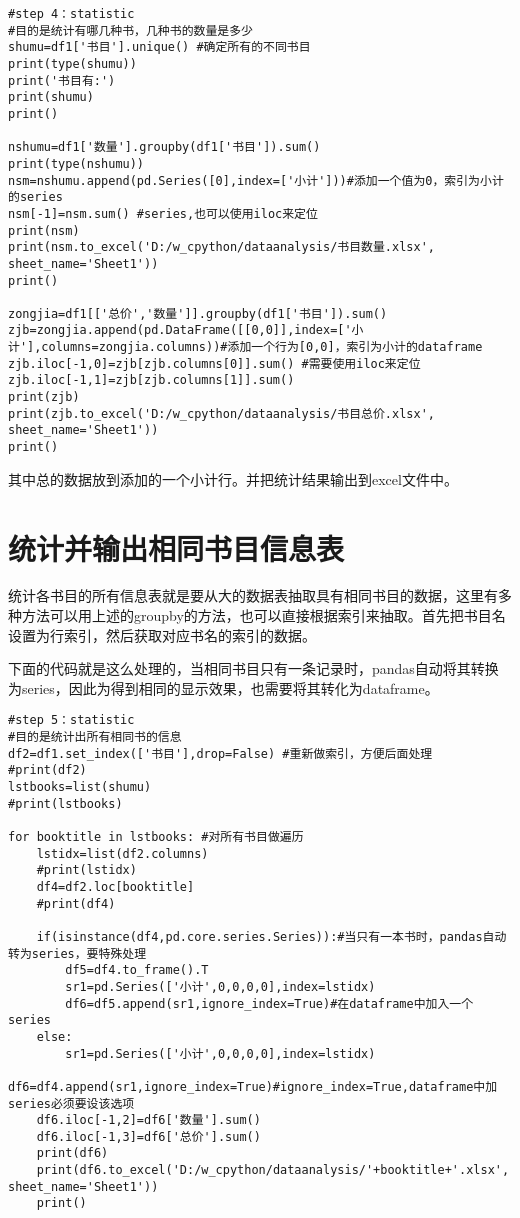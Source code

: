 \documentclass[twoside,11pt]{book}
\begin{document}
\begin{lstlisting}
#step 4：statistic
#目的是统计有哪几种书，几种书的数量是多少
shumu=df1['书目'].unique() #确定所有的不同书目
print(type(shumu))
print('书目有:')
print(shumu)
print()

nshumu=df1['数量'].groupby(df1['书目']).sum()
print(type(nshumu))
nsm=nshumu.append(pd.Series([0],index=['小计']))#添加一个值为0，索引为小计的series
nsm[-1]=nsm.sum() #series,也可以使用iloc来定位
print(nsm)
print(nsm.to_excel('D:/w_cpython/dataanalysis/书目数量.xlsx', sheet_name='Sheet1'))
print()

zongjia=df1[['总价','数量']].groupby(df1['书目']).sum()
zjb=zongjia.append(pd.DataFrame([[0,0]],index=['小计'],columns=zongjia.columns))#添加一个行为[0,0]，索引为小计的dataframe
zjb.iloc[-1,0]=zjb[zjb.columns[0]].sum() #需要使用iloc来定位
zjb.iloc[-1,1]=zjb[zjb.columns[1]].sum()
print(zjb)
print(zjb.to_excel('D:/w_cpython/dataanalysis/书目总价.xlsx', sheet_name='Sheet1'))
print()
\end{lstlisting}

其中总的数据放到添加的一个小计行。并把统计结果输出到excel文件中。

\section{统计并输出相同书目信息表}

统计各书目的所有信息表就是要从大的数据表抽取具有相同书目的数据，这里有多种方法可以用上述的groupby的方法，也可以直接根据索引来抽取。首先把书目名设置为行索引，然后获取对应书名的索引的数据。

下面的代码就是这么处理的，当相同书目只有一条记录时，pandas自动将其转换为series，因此为得到相同的显示效果，也需要将其转化为dataframe。

\begin{lstlisting}
#step 5：statistic
#目的是统计出所有相同书的信息
df2=df1.set_index(['书目'],drop=False) #重新做索引，方便后面处理
#print(df2)
lstbooks=list(shumu)
#print(lstbooks)

for booktitle in lstbooks: #对所有书目做遍历
    lstidx=list(df2.columns)
    #print(lstidx)
    df4=df2.loc[booktitle]
    #print(df4)
    
    if(isinstance(df4,pd.core.series.Series)):#当只有一本书时，pandas自动转为series，要特殊处理
        df5=df4.to_frame().T
        sr1=pd.Series(['小计',0,0,0,0],index=lstidx)
        df6=df5.append(sr1,ignore_index=True)#在dataframe中加入一个series
    else:
        sr1=pd.Series(['小计',0,0,0,0],index=lstidx)
        df6=df4.append(sr1,ignore_index=True)#ignore_index=True,dataframe中加series必须要设该选项
    df6.iloc[-1,2]=df6['数量'].sum()
    df6.iloc[-1,3]=df6['总价'].sum()
    print(df6)
    print(df6.to_excel('D:/w_cpython/dataanalysis/'+booktitle+'.xlsx', sheet_name='Sheet1'))
    print()
\end{lstlisting}
\end{document}
